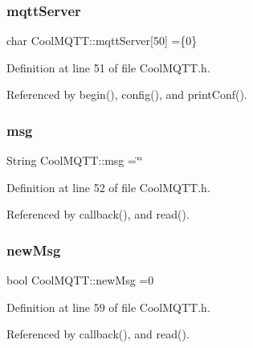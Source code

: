 \subsubsection{\texorpdfstring{mqtt\+Server}{mqttServer}}
{\footnotesize\ttfamily char Cool\+M\+Q\+T\+T\+::mqtt\+Server\mbox{[}50\mbox{]} =\{\textquotesingle{}0\textquotesingle{}\}\hspace{0.3cm}{\ttfamily [private]}}



Definition at line 51 of file Cool\+M\+Q\+T\+T.\+h.



Referenced by begin(), config(), and print\+Conf().

\mbox{\label{classCoolMQTT_af6b19e7074dbbb4ae493c44dcb53f7ff}} 
\subsubsection{\texorpdfstring{msg}{msg}}
{\footnotesize\ttfamily String Cool\+M\+Q\+T\+T\+::msg =\char`\"{}\char`\"{}\hspace{0.3cm}{\ttfamily [private]}}



Definition at line 52 of file Cool\+M\+Q\+T\+T.\+h.



Referenced by callback(), and read().

\mbox{\label{classCoolMQTT_a3240388137b885775aadf38e96b24c6b}} 
\subsubsection{\texorpdfstring{new\+Msg}{newMsg}}
{\footnotesize\ttfamily bool Cool\+M\+Q\+T\+T\+::new\+Msg =0\hspace{0.3cm}{\ttfamily [private]}}



Definition at line 59 of file Cool\+M\+Q\+T\+T.\+h.



Referenced by callback(), and read().

\mbox{\label{classCoolMQTT_a109c786a17b463f9eeba046194279522}} 
